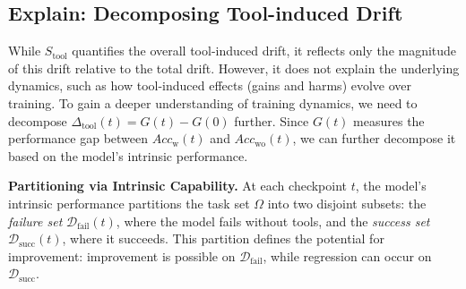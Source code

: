 \subsection{Explain: Decomposing Tool-induced Drift}
\label{subec:explain}
%
While \( S_{\text{tool}} \) quantifies the overall tool-induced drift, it reflects only the magnitude of this drift relative to the total drift.  
However, it does not explain the underlying dynamics, such as how tool-induced effects (gains and harms) evolve over training.  
To gain a deeper understanding of training dynamics, we need to decompose \( \Delta_{\mathrm{tool}}(t) = G(t) - G(0) \) further.  
Since \( G(t) \) measures the performance gap between \( Acc_{\mathrm{w}}(t) \) and \( Acc_{\mathrm{wo}}(t) \), we can further decompose it based on the model's intrinsic performance.


\textbf{Partitioning via Intrinsic Capability.}
At each checkpoint \( t \), the model's intrinsic performance partitions the task set $\Omega$ into two disjoint subsets: the \textit{failure set} $\mathcal{D}_{\text{fail}}(t)$, where the model fails without tools, and the \textit{success set} $\mathcal{D}_{\text{succ}}(t)$, where it succeeds.
%
This partition defines the potential for improvement: improvement is possible on $\mathcal{D}_{\text{fail}}$, while regression can occur on $\mathcal{D}_{\text{succ}}$.

